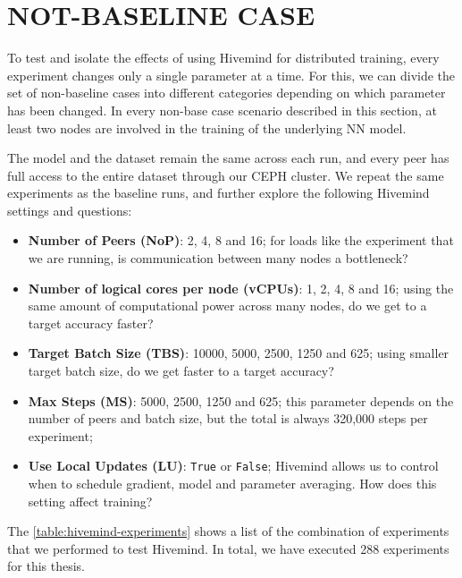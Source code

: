 \section{NOT-BASELINE CASE}\label{sec:not-baseline-case}

To test and isolate the effects of using Hivemind for distributed training, every experiment changes only a single parameter at a time.
For this, we can divide the set of non-baseline cases into different categories depending on which parameter has been changed.
In every non-base case scenario described in this section, at least two nodes are involved in the training of the underlying NN model.

The model and the dataset remain the same across each run, and every peer has full access to the entire dataset through our CEPH cluster.
We repeat the same experiments as the baseline runs, and further explore the following Hivemind settings and questions:
\begin{itemize}
    \item \textbf{Number of Peers (NoP)}: 2, 4, 8 and 16; for loads like the experiment that we are running, is communication between many nodes a bottleneck?
    \item \textbf{Number of logical cores per node (vCPUs)}: 1, 2, 4, 8 and 16; using the same amount of computational power across many nodes, do we get to a target accuracy faster?
    \item \textbf{Target Batch Size (TBS)}: 10000, 5000, 2500, 1250 and 625; using smaller target batch size, do we get faster to a target accuracy?
    \item \textbf{Max Steps (MS)}: 5000, 2500, 1250 and 625; this parameter depends on the number of peers and batch size, but the total is always 320,000 steps per experiment;
    \item \textbf{Use Local Updates (LU)}: \texttt{True} or \texttt{False}; Hivemind allows us to control when to schedule gradient, model and parameter averaging. How does this setting affect training?
\end{itemize}

The \autoref{table:hivemind-experiments} shows a list of the combination of experiments that we performed to test Hivemind.
In total, we have executed 288 experiments for this thesis.

